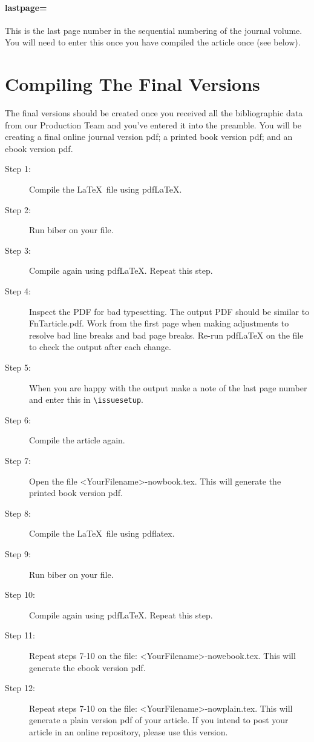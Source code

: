 \documentclass[examplefnt,biber]{nowfnt} %
\begin{document}
\paragraph{lastpage=}
This is the last page number in the sequential numbering of the journal volume. You will need to enter this
once you have compiled the article once (see below).


\section{Compiling The Final Versions}\label{s:Final}

The final versions should be created once you received all the bibliographic data from our Production Team
and you've entered it into the preamble. You will be creating a final online journal version pdf; a printed book version pdf;
and an ebook version pdf.
\begin{description}
\item [Step 1:] Compile the \LaTeX\ file using pdfLaTeX.\cite{arvolumeonly}
\item [Step 2:] Run biber on your file.
\item [Step 3:] Compile again using pdfLaTeX. Repeat this step.
\item [Step 4:] Inspect the PDF for bad typesetting. The output PDF should be similar to FnTarticle.pdf. Work from the first page when making adjustments to resolve bad line breaks and bad page breaks. Re-run pdfLaTeX on the file to check the output after each change.
\item [Step 5:] When you are happy with the output make a note of the last page number and enter this in  \verb+\issuesetup+.
\item [Step 6:] Compile the article again.
\item [Step 7:] Open the file <YourFilename>-nowbook.tex. This will generate the printed book version pdf.
\item [Step 8:] Compile the \LaTeX\ file using pdflatex.
\item [Step 9:] Run biber on your file.
\item [Step 10:] Compile again using pdfLaTeX. Repeat this step.
\item [Step 11:] Repeat steps 7-10 on the file: <YourFilename>-nowebook.tex. This will generate the ebook version pdf.
\item [Step 12:] Repeat steps 7-10 on the file: <YourFilename>-nowplain.tex. This will generate a plain version pdf of your article. If you intend to post your article in an online repository, please use this version.
\end{description}
\end{document}
